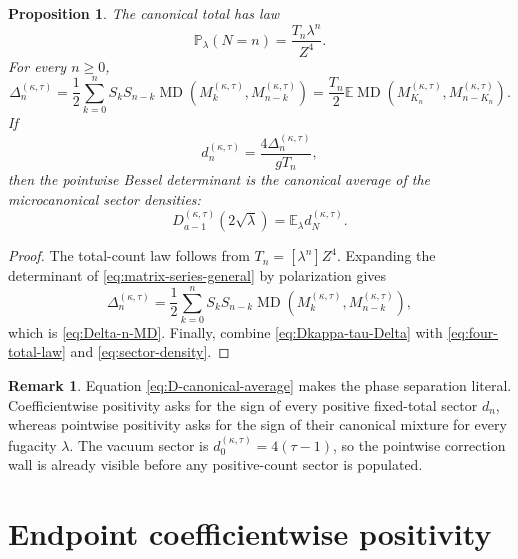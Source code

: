 \documentclass[11pt,a4paper]{amsart}
\numberwithin{equation}{section}
\theoremstyle{plain}
\newtheorem{proposition}[theorem]{Proposition}
\theoremstyle{definition}
\newtheorem{remark}[theorem]{Remark}
\newcommand{\E}{\mathbb E}
\newcommand{\MD}{\operatorname{MD}}
\begin{document}
\begin{proposition}\label{prop:four-copy}
The canonical total has law
\begin{equation}\label{eq:four-total-law}
 \mathbb P_\lambda(N=n)=\frac{T_n\lambda^n}{Z^4}.
\end{equation}
For every \(n\ge0\),
\begin{equation}\label{eq:Delta-n-MD}
 \Delta_n^{(\kappa,\tau)}
 =\frac12\sum_{k=0}^nS_kS_{n-k}
 \MD\!\left(M_k^{(\kappa,\tau)},M_{n-k}^{(\kappa,\tau)}\right)
 =\frac{T_n}{2}\E\MD\!\left(
 M_{K_n}^{(\kappa,\tau)},M_{n-K_n}^{(\kappa,\tau)}\right).
\end{equation}
If
\begin{equation}\label{eq:sector-density}
 d_n^{(\kappa,\tau)}
 =\frac{4\Delta_n^{(\kappa,\tau)}}{gT_n},
\end{equation}
then the pointwise Bessel determinant is the canonical average of the
microcanonical sector densities:
\begin{equation}\label{eq:D-canonical-average}
 D_{a-1}^{(\kappa,\tau)}(2\sqrt\lambda)
 =\E_\lambda d_N^{(\kappa,\tau)}.
\end{equation}
\end{proposition}

\begin{proof}
The total-count law follows from \(T_n=[\lambda^n]Z^4\).  Expanding the
determinant of \eqref{eq:matrix-series-general} by polarization gives
\[
 \Delta_n^{(\kappa,\tau)}
 =\frac12\sum_{k=0}^nS_kS_{n-k}
 \MD\!\left(M_k^{(\kappa,\tau)},M_{n-k}^{(\kappa,\tau)}\right),
\]
which is \eqref{eq:Delta-n-MD}.  Finally, combine
\eqref{eq:Dkappa-tau-Delta} with \eqref{eq:four-total-law} and
\eqref{eq:sector-density}.
\end{proof}

\begin{remark}\label{rem:ensemble-positivity}
Equation \eqref{eq:D-canonical-average} makes the phase separation literal.
Coefficientwise positivity asks for the sign of every positive fixed-total
sector \(d_n\), whereas pointwise positivity asks for the sign of their
canonical mixture for every fugacity \(\lambda\).  The vacuum sector is
\(d_0^{(\kappa,\tau)}=4(\tau-1)\),
so the pointwise correction wall is already visible before any positive-count
sector is populated.
\end{remark}

\section{Endpoint coefficientwise positivity}\label{sec:endpoint}
\end{document}
